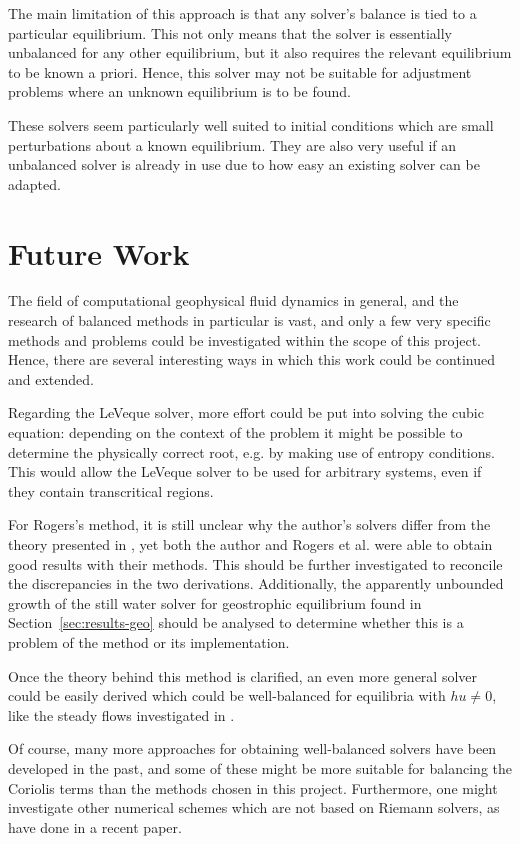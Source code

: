 The main limitation of this approach is that any solver's balance is tied to a particular equilibrium. This not only means that the solver is essentially unbalanced for any other equilibrium, but it also requires the relevant equilibrium to be known a priori. Hence, this solver may not be suitable for adjustment problems where an unknown equilibrium is to be found.

These solvers seem particularly well suited to initial conditions which are small perturbations about a known equilibrium. They are also very useful if an unbalanced solver is already in use due to how easy an existing solver can be adapted.

\section{Future Work}

The field of computational geophysical fluid dynamics in general, and the research of balanced methods in particular is vast, and only a few very specific methods and problems could be investigated within the scope of this project. Hence, there are several interesting ways in which this work could be continued and extended.

Regarding the LeVeque solver, more effort could be put into solving the cubic equation: depending on the context of the problem it might be possible to determine the physically correct root, e.g. by making use of entropy conditions. This would allow the LeVeque solver to be used for arbitrary systems, even if they contain transcritical regions.

For Rogers's method, it is still unclear why the author's solvers differ from the theory presented in \cite{rogers2003mathematical}, yet both the author and Rogers et al. were able to obtain good results with their methods. This should be further investigated to reconcile the discrepancies in the two derivations. Additionally, the apparently unbounded growth of the still water solver for geostrophic equilibrium found in Section~\ref{sec:results-geo} should be analysed to determine whether this is a problem of the method or its implementation.

Once the theory behind this method is clarified, an even more general solver could be easily derived which could be well-balanced for equilibria with $hu \neq 0$, like the steady flows investigated in \cite{esler2005steady}.

Of course, many more approaches for obtaining well-balanced solvers have been developed in the past, and some of these might be more suitable for balancing the Coriolis terms than the methods chosen in this project. Furthermore, one might investigate other numerical schemes which are not based on Riemann solvers, as \citet{chertockwell} have done in a recent paper.

